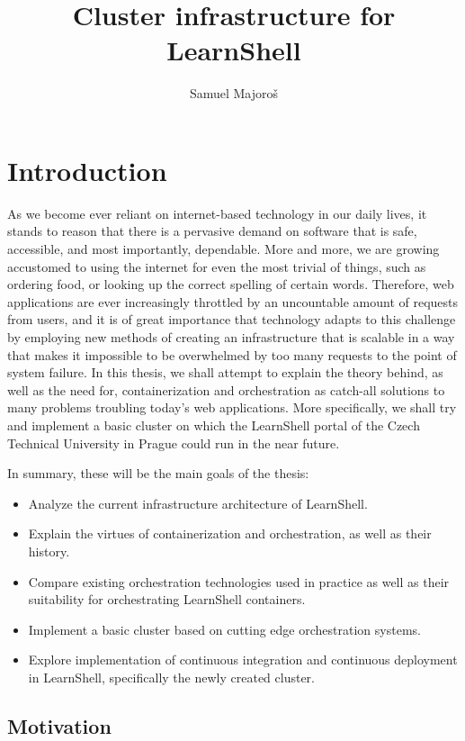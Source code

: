 \documentclass[thesis=B,english]{FITthesis}[2019/12/23]
\title{Cluster infrastructure for LearnShell}
\author{Samuel Majoroš} %
\begin{document}

\chapter{Introduction}

As we become ever reliant on internet-based technology in our daily lives, it stands to reason that there is a pervasive demand on software that is safe, accessible, and most importantly, dependable. More and more, we are growing accustomed to using the internet for even the most trivial of things, such as ordering food, or looking up the correct spelling of certain words. Therefore, web applications are ever increasingly throttled by an uncountable amount of requests from users, and it is of great importance that technology adapts to this challenge by employing new methods of creating an infrastructure that is scalable in a way that makes it impossible to be overwhelmed by too many requests to the point of system failure. In this thesis, we shall attempt to explain the theory behind, as well as the need for, containerization and orchestration as catch-all solutions to many problems troubling today's web applications. More specifically, we shall try and implement a basic cluster on which the LearnShell portal of the Czech Technical University in Prague could run in the near future. 

In summary, these will be the main goals of the thesis:
\begin{itemize}
  \setlength\itemsep{0em}
  \item Analyze the current infrastructure architecture of LearnShell.
  \item Explain the virtues of containerization and orchestration, as well as their history.
  \item Compare existing orchestration technologies used in practice as well as their suitability for orchestrating LearnShell containers.
  \item Implement a basic cluster based on cutting edge orchestration systems.
  \item Explore implementation of continuous integration and continuous deployment in LearnShell, specifically the newly created cluster.
\end{itemize}

\section{Motivation}
\end{document}
